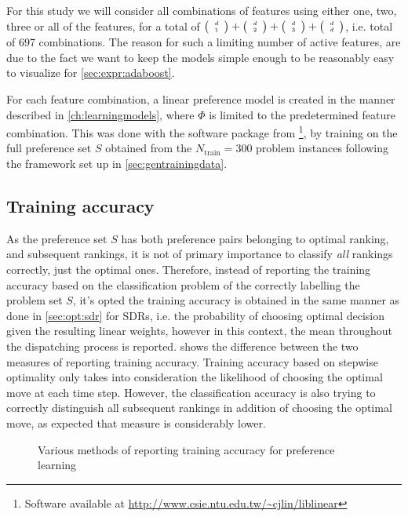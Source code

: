 \documentclass[smallextended]{svjour3}
\begin{document}
For this study we will consider all combinations of features using either one, two, three or all of the features, for a total of $\tiny \left(\begin{array}{c}d\\1\end{array}\right)+\tiny \left(\begin{array}{c}d\\2\end{array}\right)+\tiny \left(\begin{array}{c}d\\3\end{array}\right)+\tiny \left(\begin{array}{c}d\\d\end{array}\right)$, i.e. total of 697 combinations. The reason for such a limiting number of active features, are due to the fact we want to keep the models simple enough to be reasonably easy to visualize for \cref{sec:expr:adaboost}. %

For each feature combination, a linear preference model is created in the manner described in \cref{ch:learningmodels}, where $\Phi$ is limited to the predetermined feature combination. This was done with the software package from \cite{liblinear}\footnote{Software available at \url{http://www.csie.ntu.edu.tw/~cjlin/liblinear}}, by training on the full preference set $S$ obtained from the $N_{\text{train}}=300$ problem instances following the framework set up in \cref{sec:gentrainingdata}. 

\subsection{Training accuracy}\label{sec:CDR:acc}
As the preference set $S$ has both preference pairs belonging to optimal ranking, and subsequent rankings, it is not of primary importance to classify \emph{all} rankings correctly, just the optimal ones. Therefore, instead of reporting the training accuracy based on the classification problem of the correctly labelling the problem set $S$, it's opted the training accuracy is obtained in the same manner as done in \cref{sec:opt:sdr} for SDRs, i.e. the probability of choosing optimal decision given the resulting linear weights, however in this context, the mean throughout the dispatching process is reported.  shows the difference between the two measures of reporting training accuracy. Training accuracy based on stepwise optimality only takes into consideration the likelihood of choosing the optimal move at each time step. However, the classification accuracy is also trying to correctly distinguish all subsequent rankings in addition of choosing the optimal move, as expected that measure is considerably lower. 

\begin{figure}[th!]
\centering
{}%
\caption{Various methods of reporting training accuracy for preference learning}
\label{fig:stepwise_vs_classification}
\end{figure}
\end{document}
